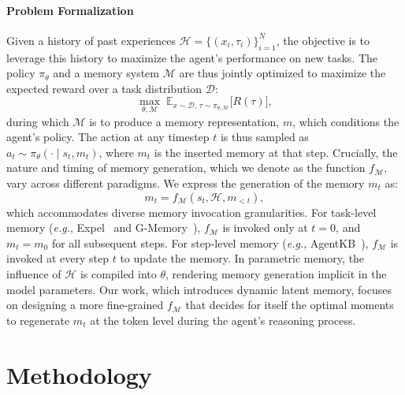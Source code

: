 \documentclass[]{fairmeta}
\begin{document}
\paragraph{Problem Formalization}
Given a history of past experiences $\mathcal{H} = \{ ({x}_i, {\tau}_i) \}_{i=1}^N$, the objective is to leverage this history to maximize the agent's performance on new tasks. The policy $\pi_\theta$ and a memory system $\mathcal{M}$ are thus jointly optimized to maximize the expected reward over a task distribution $\mathcal{D}$:
\begin{equation}
\max_{\theta, \mathcal{M}} \; \mathbb{E}_{{x} \sim \mathcal{D}, \, {\tau} \sim \pi_{\theta, \mathcal{M}}} \big[ R({\tau}) \big], 
\end{equation}
during which $\mathcal{M}$ is to produce a memory representation, ${m}$, which conditions the agent's policy. The action at any timestep $t$ is thus sampled as ${a}_t \sim \pi_\theta( \cdot \mid {s}_t, {m}_t)$, where ${m}_t$ is the inserted memory at that step. Crucially, the nature and timing of memory generation, which we denote as the function $f_{\mathcal{M}}$, vary across different paradigms. We express the generation of the memory $m_t$ as:
\begin{equation}
{m}_t = f_{\mathcal{M}}({s}_t, \mathcal{H}, {m}_{<t}),
\end{equation}
which accommodates diverse memory invocation granularities. For task-level memory (\textit{e.g.}, Expel~\citep{zhao2024expelllmagentsexperiential} and G-Memory~\citep{zhang2025gmemorytracinghierarchicalmemory}), $f_{\mathcal{M}}$ is invoked only at $t=0$, and ${m}_t = {m}_0$ for all subsequent steps. For step-level memory (\textit{e.g.}, AgentKB~\citep{tang2025agentkbleveragingcrossdomain}), $f_{\mathcal{M}}$ is invoked at every step $t$ to update the memory. In parametric memory, the influence of \(\mathcal{H}\) is compiled into \(\theta\), rendering memory generation implicit in the model parameters. Our work, which introduces dynamic latent memory, focuses on designing a more fine-grained $f_{\mathcal{M}}$ that decides for itself the optimal moments to regenerate ${m}_t$ at the token level during the agent's reasoning process.


\vspace{-0.5em}
\section{Methodology}
\end{document}
